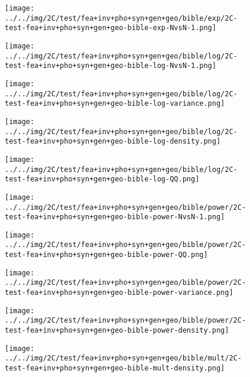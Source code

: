 \begin{figure}[H]
\centering	\texttt{[image: ../../img/2C/test/fea+inv+pho+syn+gen+geo/bible/exp/2C-test-fea+inv+pho+syn+gen+geo-bible-exp-NvsN-1.png]}
\end{figure}
\begin{figure}[H]
\centering	\texttt{[image: ../../img/2C/test/fea+inv+pho+syn+gen+geo/bible/log/2C-test-fea+inv+pho+syn+gen+geo-bible-log-NvsN-1.png]}
\end{figure}
\begin{figure}[H]
\centering	\texttt{[image: ../../img/2C/test/fea+inv+pho+syn+gen+geo/bible/log/2C-test-fea+inv+pho+syn+gen+geo-bible-log-variance.png]}
\end{figure}
\begin{figure}[H]
\centering	\texttt{[image: ../../img/2C/test/fea+inv+pho+syn+gen+geo/bible/log/2C-test-fea+inv+pho+syn+gen+geo-bible-log-density.png]}
\end{figure}
\begin{figure}[H]
\centering	\texttt{[image: ../../img/2C/test/fea+inv+pho+syn+gen+geo/bible/log/2C-test-fea+inv+pho+syn+gen+geo-bible-log-QQ.png]}
\end{figure}
\begin{figure}[H]
\centering	\texttt{[image: ../../img/2C/test/fea+inv+pho+syn+gen+geo/bible/power/2C-test-fea+inv+pho+syn+gen+geo-bible-power-NvsN-1.png]}
\end{figure}
\begin{figure}[H]
\centering	\texttt{[image: ../../img/2C/test/fea+inv+pho+syn+gen+geo/bible/power/2C-test-fea+inv+pho+syn+gen+geo-bible-power-QQ.png]}
\end{figure}
\begin{figure}[H]
\centering	\texttt{[image: ../../img/2C/test/fea+inv+pho+syn+gen+geo/bible/power/2C-test-fea+inv+pho+syn+gen+geo-bible-power-variance.png]}
\end{figure}
\begin{figure}[H]
\centering	\texttt{[image: ../../img/2C/test/fea+inv+pho+syn+gen+geo/bible/power/2C-test-fea+inv+pho+syn+gen+geo-bible-power-density.png]}
\end{figure}
\begin{figure}[H]
\centering	\texttt{[image: ../../img/2C/test/fea+inv+pho+syn+gen+geo/bible/mult/2C-test-fea+inv+pho+syn+gen+geo-bible-mult-density.png]}
\end{figure}
